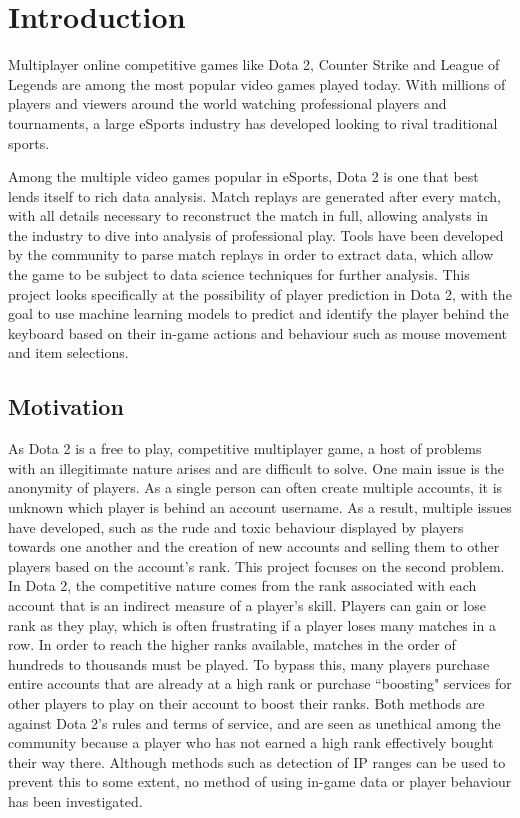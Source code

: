 \documentclass[Report.tex]{subfiles}
\begin{document}
\section{Introduction}
Multiplayer online competitive games like Dota 2, Counter Strike and League of Legends are among the most popular video games played today. With millions of players and viewers around the world watching professional players and tournaments, a large eSports industry has developed looking to rival traditional sports. 

Among the multiple video games popular in eSports, Dota 2 is one that best lends itself to rich data analysis. Match replays are generated after every match, with all details necessary to reconstruct the match in full, allowing analysts in the industry to dive into analysis of professional play. Tools have been developed by the community to parse match replays in order to extract data, which allow the game to be subject to data science techniques for further analysis. This project looks specifically at the possibility of player prediction in Dota 2, with the goal to use machine learning models to predict and identify the player behind the keyboard based on their in-game actions and behaviour such as mouse movement and item selections. 

\subsection{Motivation}
As Dota 2 is a free to play, competitive multiplayer game, a host of problems with an illegitimate nature arises and are difficult to solve. One main issue is the anonymity of players. As a single person can often create multiple accounts, it is unknown which player is behind an account username. As a result, multiple issues have developed, such as the rude and toxic behaviour displayed by players towards one another \cite{toxic} and the creation of new accounts and selling them to other players based on the account's rank. This project focuses on the second problem. In Dota 2, the competitive nature comes from the rank associated with each account that is an indirect measure of a player's skill. Players can gain or lose rank as they play, which is often frustrating if a player loses many matches in a row. In order to reach the higher ranks available, matches in the order of hundreds to thousands must be played. To bypass this, many players purchase entire accounts that are already at a high rank or purchase ``boosting" services for other players to play on their account to boost their ranks. Both methods are against Dota 2's rules and terms of service, and are seen as unethical among the community because a player who has not earned a high rank effectively bought their way there. Although methods such as detection of IP ranges can be used to prevent this to some extent, no method of using in-game data or player behaviour has been investigated. 
\end{document}
